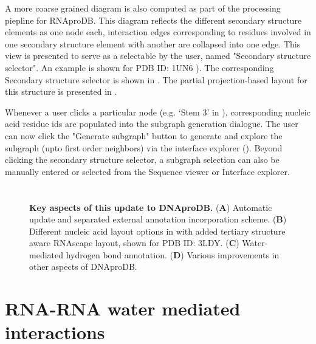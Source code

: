 A more coarse grained diagram is also computed as part of the processing piepline for RNAproDB. This diagram reflects the different secondary structure elements as one node each, interaction edges corresponding to residues involved in one secondary structure element with another are collapsed into one edge. This view is presented to serve as a selectable by the user, named "Secondary structure selector". An example is shown for PDB ID: 1UN6 ). The corresponding Secondary structure selector is shown in . The partial projection-based layout for this structure is presented in . 

Whenever a user clicks a particular node (e.g. `Stem 3' in ), corresponding nucleic acid residue ids are populated into the subgraph generation dialogue. The user can now click the "Generate subgraph" button to generate and explore the subgraph (upto first order neighbors) via the interface explorer (). Beyond clicking the secondary structure selector, a subgraph selection can also be manually entered or selected from the Sequence viewer or Interface explorer. 

\section{}

\begin{center}
    \begin{figure}
        \caption[Key aspects of this update to DNAproDB.]{\textbf{Key aspects of this update to DNAproDB.} ({\bf A}) Automatic update and separated external annotation incorporation scheme.  ({\bf B})  Different nucleic acid layout options in with added tertiary structure aware RNAscape layout, shown for PDB ID: 3LDY. ({\bf C}) Water-mediated hydrogen bond annotation. ({\bf D}) Various improvements in other aspects of DNAproDB. }
  \label{fig:rnaprodb2}
\end{figure}
\end{center}

\section{RNA-RNA water mediated interactions}


